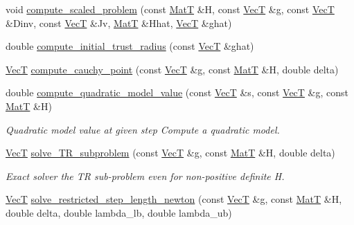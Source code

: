 \begin{DoxyCompactItemize}
\item 
void \hyperlink{namespacemappel_1_1estimator_1_1subroutine_a12cda60151ce1285a6ae8c82b61d484b}{compute\+\_\+scaled\+\_\+problem} (const \hyperlink{namespacemappel_a7091ab87c528041f7e2027195fad8915}{MatT} \&H, const \hyperlink{namespacemappel_a2225ad69f358daa3f4f99282a35b9a3a}{VecT} \&g, const \hyperlink{namespacemappel_a2225ad69f358daa3f4f99282a35b9a3a}{VecT} \&Dinv, const \hyperlink{namespacemappel_a2225ad69f358daa3f4f99282a35b9a3a}{VecT} \&Jv, \hyperlink{namespacemappel_a7091ab87c528041f7e2027195fad8915}{MatT} \&Hhat, \hyperlink{namespacemappel_a2225ad69f358daa3f4f99282a35b9a3a}{VecT} \&ghat)
\item 
double \hyperlink{namespacemappel_1_1estimator_1_1subroutine_adc2b09806f8f22cf797e00840d310734}{compute\+\_\+initial\+\_\+trust\+\_\+radius} (const \hyperlink{namespacemappel_a2225ad69f358daa3f4f99282a35b9a3a}{VecT} \&ghat)
\item 
\hyperlink{namespacemappel_a2225ad69f358daa3f4f99282a35b9a3a}{VecT} \hyperlink{namespacemappel_1_1estimator_1_1subroutine_a44afae701c4ebfa4ecc6fbb8e43e117c}{compute\+\_\+cauchy\+\_\+point} (const \hyperlink{namespacemappel_a2225ad69f358daa3f4f99282a35b9a3a}{VecT} \&g, const \hyperlink{namespacemappel_a7091ab87c528041f7e2027195fad8915}{MatT} \&H, double delta)
\item 
double \hyperlink{namespacemappel_1_1estimator_1_1subroutine_aad294d44d135403caf44869b9c72c529}{compute\+\_\+quadratic\+\_\+model\+\_\+value} (const \hyperlink{namespacemappel_a2225ad69f358daa3f4f99282a35b9a3a}{VecT} \&s, const \hyperlink{namespacemappel_a2225ad69f358daa3f4f99282a35b9a3a}{VecT} \&g, const \hyperlink{namespacemappel_a7091ab87c528041f7e2027195fad8915}{MatT} \&H)
\begin{DoxyCompactList}\small\item\em Quadratic model value at given step Compute a quadratic model. \end{DoxyCompactList}\item 
\hyperlink{namespacemappel_a2225ad69f358daa3f4f99282a35b9a3a}{VecT} \hyperlink{namespacemappel_1_1estimator_1_1subroutine_a253df60d2e10693221da3dad4f279165}{solve\+\_\+\+T\+R\+\_\+subproblem} (const \hyperlink{namespacemappel_a2225ad69f358daa3f4f99282a35b9a3a}{VecT} \&g, const \hyperlink{namespacemappel_a7091ab87c528041f7e2027195fad8915}{MatT} \&H, double delta)
\begin{DoxyCompactList}\small\item\em Exact solver the TR sub-\/problem even for non-\/positive definite H. \end{DoxyCompactList}\item 
\hyperlink{namespacemappel_a2225ad69f358daa3f4f99282a35b9a3a}{VecT} \hyperlink{namespacemappel_1_1estimator_1_1subroutine_aeec8d62491c9680e306592dde26d9189}{solve\+\_\+restricted\+\_\+step\+\_\+length\+\_\+newton} (const \hyperlink{namespacemappel_a2225ad69f358daa3f4f99282a35b9a3a}{VecT} \&g, const \hyperlink{namespacemappel_a7091ab87c528041f7e2027195fad8915}{MatT} \&H, double delta, double lambda\+\_\+lb, double lambda\+\_\+ub)
\end{DoxyCompactItemize}



